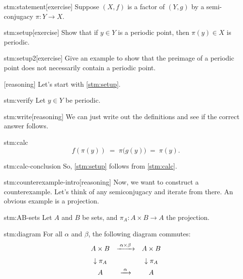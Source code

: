 
\begin{stm}{stm:statement}[exercise]
Suppose $(X,f)$ is a factor of $(Y,g)$ by a semi-conjugacy $\pi\colon Y \to X$.
\end{stm}

\begin{stm}{stm:setup}[exercise]
Show that if $y \in Y$ is a periodic point, then $\pi(y) \in X$ is periodic.
\end{stm}

\begin{stm}{stm:setup2}[exercise]
Give an example to show that the preimage of a periodic point does not necessarily contain a periodic point.
\end{stm}


\begin{stm}{}[reasoning]
Let's start with \ref{stm:setup}.
\end{stm}

\begin{stm}{stm:verify}
Let $y \in Y$ be periodic.
\end{stm}

\begin{stm}{stm:write}[reasoning]
We can just write out the definitions and see if the correct answer follows.
\end{stm}

\begin{stm}{stm:calc}
$$
f(\pi(y)) \;=\; \pi\bigl(g(y)\bigr) \;=\; \pi(y).
$$
\end{stm}

\begin{stm}{stm:calc-conclusion}
So, \ref{stm:setup} follows from \ref{stm:calc}.
\end{stm}

\begin{stm}{stm:counterexample-intro}[reasoning]
Now, we want to construct a counterexample. Let's think of any semiconjugacy and iterate from there. An obvious example is a projection.
\end{stm}

\begin{stm}{stm:AB-sets}
Let $A$ and $B$ be sets, and $\pi_A\colon A \times B \to A$ the projection.
\end{stm}

\begin{stm}{stm:diagram}
For all $\alpha$ and $\beta$, the following diagram commutes:
\[
\begin{array}{c@{\quad}c@{\quad}c}
A \times B & \xrightarrow{\;\alpha \times \beta\;} & A \times B\\[6pt]
\downarrow{\pi_A} && \downarrow{\pi_A}\\[4pt]
A & \xrightarrow{\;\alpha\;} & A
\end{array}
\]
\end{stm}

